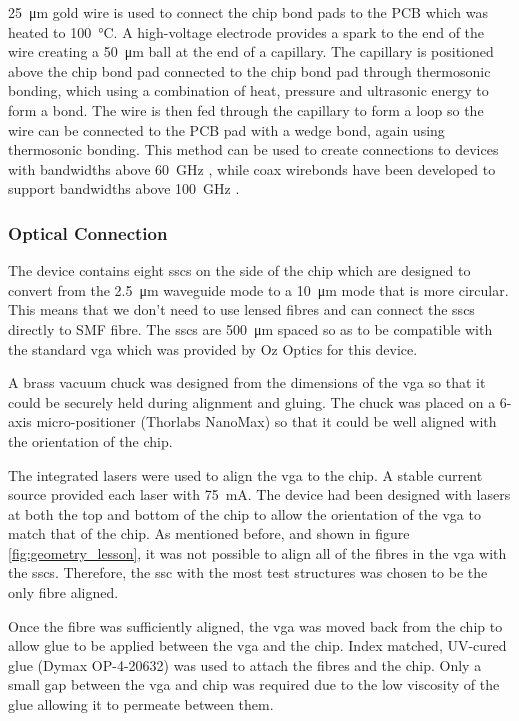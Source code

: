 \SI{25}{\um} gold wire is used to connect the chip bond pads to the PCB which was heated to \SI{100}{\celsius}. A high-voltage electrode provides a spark to the end of the wire creating a \SI{50}{\um} ball at the end of a capillary. The capillary is positioned above the chip bond pad connected to the chip bond pad through thermosonic bonding, which using a combination of heat, pressure and ultrasonic energy to form a bond. The wire is then fed through the capillary to form a loop so the wire can be connected to the PCB pad with a wedge bond, again using thermosonic bonding. This method can be used to create connections to devices with bandwidths above \SI{60}{GHz} \cite{chen2015bandwidth}, while coax wirebonds have been developed to support bandwidths above \SI{100}{GHz} \cite{cahill2006development}.

\subsubsection*{Optical Connection}

The device contains eight \acp{ssc} on the side of the chip which are designed to convert from the \SI{2.5}{\um} waveguide mode to a \SI{10}{\um} mode that is more circular. This means that we don't need to use lensed fibres and can connect the \acp{ssc} directly to SMF fibre. The \acp{ssc} are \SI{500}{\um} spaced so as to be compatible with the standard \acs{vga} which was provided by Oz Optics for this device. 

A brass vacuum chuck was designed from the dimensions of the \ac{vga} so that it could be securely held during alignment and gluing. The chuck was placed on a 6-axis micro-positioner (Thorlabs NanoMax) so that it could be well aligned with the orientation of the chip. 

The integrated lasers were used to align the \ac{vga} to the chip. A stable current source provided each laser with \SI{75}{\mA}. The device had been designed with lasers at both the top and bottom of the chip to allow the orientation of the \ac{vga} to match that of the chip. As mentioned before, and shown in figure \ref{fig:geometry_lesson}, it was not possible to align all of the fibres in the \ac{vga} with the \acp{ssc}. Therefore, the \ac{ssc} with the most test structures was chosen to be the only fibre aligned. 


Once the fibre was sufficiently aligned, the \ac{vga} was moved back from the chip to allow glue to be applied between the \ac{vga} and the chip. Index matched, UV-cured glue (Dymax OP-4-20632) was used to attach the fibres and the chip. Only a small gap between the \ac{vga} and chip was required due to the low viscosity of the glue allowing it to permeate between them. 

